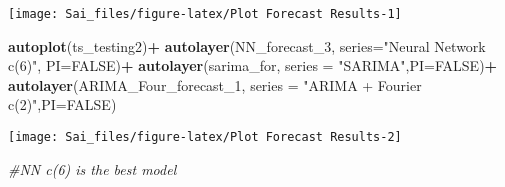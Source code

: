 \documentclass[
]{article}
\newenvironment{Shaded}{\begin{snugshade}}{\end{snugshade}}
\newcommand{\AttributeTok}[1]{\textcolor[rgb]{0.13,0.29,0.53}{#1}}
\newcommand{\CommentTok}[1]{\textcolor[rgb]{0.56,0.35,0.01}{\textit{#1}}}
\newcommand{\ConstantTok}[1]{\textcolor[rgb]{0.56,0.35,0.01}{#1}}
\newcommand{\FunctionTok}[1]{\textcolor[rgb]{0.13,0.29,0.53}{\textbf{#1}}}
\newcommand{\NormalTok}[1]{#1}
\newcommand{\OtherTok}[1]{\textcolor[rgb]{0.56,0.35,0.01}{#1}}
\newcommand{\SpecialCharTok}[1]{\textcolor[rgb]{0.81,0.36,0.00}{\textbf{#1}}}
\newcommand{\StringTok}[1]{\textcolor[rgb]{0.31,0.60,0.02}{#1}}
\begin{document}
\begin{Shaded}
\end{Shaded}

\begin{center}\texttt{[image: Sai\_files/figure-latex/Plot Forecast Results-1]} \end{center}

\begin{Shaded}
\begin{Highlighting}[]
\FunctionTok{autoplot}\NormalTok{(ts\_testing2)}\SpecialCharTok{+}
  \FunctionTok{autolayer}\NormalTok{(NN\_forecast\_3, }\AttributeTok{series=}\StringTok{"Neural Network c(6)"}\NormalTok{, }\AttributeTok{PI=}\ConstantTok{FALSE}\NormalTok{)}\SpecialCharTok{+}
  \FunctionTok{autolayer}\NormalTok{(sarima\_for, }\AttributeTok{series =} \StringTok{"SARIMA"}\NormalTok{,}\AttributeTok{PI=}\ConstantTok{FALSE}\NormalTok{)}\SpecialCharTok{+}
  \FunctionTok{autolayer}\NormalTok{(ARIMA\_Four\_forecast\_1, }\AttributeTok{series =} \StringTok{"ARIMA + Fourier c(2)"}\NormalTok{,}\AttributeTok{PI=}\ConstantTok{FALSE}\NormalTok{)}
\end{Highlighting}
\end{Shaded}

\begin{center}\texttt{[image: Sai\_files/figure-latex/Plot Forecast Results-2]} \end{center}

\begin{Shaded}
\begin{Highlighting}[]
\CommentTok{\#NN c(6) is the best model}
\end{Highlighting}
\end{Shaded}
\end{document}
